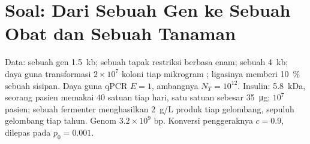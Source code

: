 \section{Soal: Dari Sebuah Gen ke Sebuah Obat dan Sebuah Tanaman}

\begin{problem}
\label{pb:b3:genetic-engineering:1}
Data: sebuah gen \qty{1.5}{kb}; sebuah tapak restriksi berbasa enam; sebuah
 \qty{4}{kb}; daya guna transformasi $2\times 10^{7}$ koloni tiap
mikrogram ; ligasinya memberi \qty{10}{\%}  sebuah
sisipan. Daya guna qPCR $E = 1$, ambangnya $N_{T} = 10^{12}$. Insulin:
\qty{5.8}{kDa}, seorang pasien memakai $40$ satuan tiap hari, satu satuan
sebesar \qty{35}{\micro g}; $10^{7}$ pasien; sebuah fermenter menghasilkan
\qty{2}{g/L} produk tiap gelombang, sepuluh gelombang tiap tahun. Genom $3.2\times
10^{9}$ bp. Konversi penggeraknya $c = 0.9$, dilepas pada $p_{0} = 0.001$.


\end{problem}
